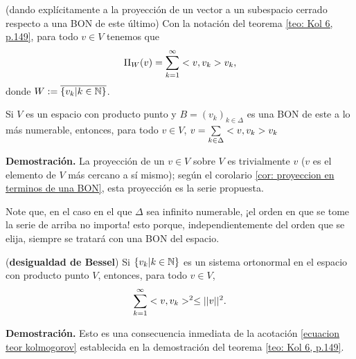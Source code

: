 \begin{cor} \label{cor: proyeccion en terminos de una BON}
(dando explícitamente a la proyección de un vector
a un subespacio cerrado respecto a una BON de este último)
Con la notación del teorema \ref{teo: Kol 6, p.149},
para todo $v \in V$
tenemos que
\[
\Pi_{W}(v) = \sum\limits_{k=1}^{\infty}<v, v_{k}>v_{k},
\]
donde $W := \overline{\{v_{k}| k \in \mathbb{N} \}}$. 
\end{cor}


\begin{cor} \label{cor: representacion de un vector respecto a una BON}
Si $V$ es un espacio con producto punto 
y $B=(v_{k})_{k \in \Delta}$ es una BON de este
a lo más numerable, entonces, para todo
$v \in V$, $v = \sum\limits_{k \in \Delta}^{}<v, v_{k}>v_{k}$
\end{cor}
\noindent
\textbf{Demostración.}
La proyección de un $v \in V$ sobre $V$ es trivialmente $v$
($v$ es el elemento de $V$ más cercano a sí mismo); según el corolario
\ref{cor: proyeccion en terminos de una BON}, esta
proyección es la serie propuesta. \QEDB
\vspace{0.2cm}

Note que, en el caso en el que $\Delta$ sea infinito numerable,
¡el orden en que se tome la serie de arriba no importa! esto porque,
independientemente del orden que se elija, siempre se tratará con
una BON del espacio. \\

\begin{cor}(\textbf{desigualdad de Bessel})
Si $\{ v_{k} | k \in \mathbb{N} \}$ es un sistema ortonormal en 
el espacio con producto punto $V$, entonces, para todo $v\in V$,
\[
\sum\limits_{k=1}^{\infty}<v , v_{k} >^{2} \leq ||v||^{2}.
\]
\end{cor}
\noindent
\textbf{Demostración.}
Esto es una consecuencia inmediata de la acotación
\eqref{ecuacion teor kolmogorov} establecida en la demostración
del teorema \ref{teo: Kol 6, p.149}.
\QEDB
\vspace{0.2cm}